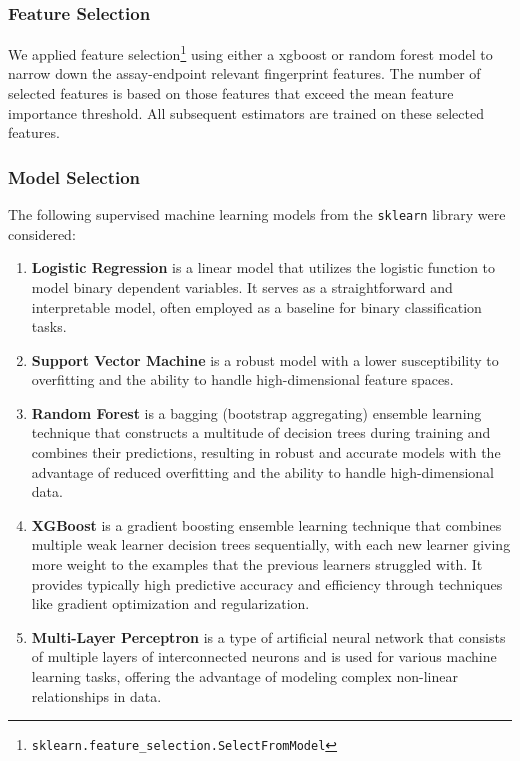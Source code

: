 \subsubsection{Feature Selection}
We applied feature selection\footnote{\texttt{sklearn.feature\_selection.SelectFromModel}} using either a xgboost or random forest model to narrow down the assay-endpoint relevant fingerprint features. The number of selected features is based on those features that exceed the mean feature importance threshold. All subsequent estimators are trained on these selected features.

\subsubsection{Model Selection}
The following supervised machine learning models from the \texttt{sklearn} library were considered: 
\begin{enumerate}
    \item \textbf{Logistic Regression} is a linear model that utilizes the logistic function to model binary dependent variables. It serves as a straightforward and interpretable model, often employed as a baseline for binary classification tasks.
    \item \textbf{Support Vector Machine} is a robust model with a lower susceptibility to overfitting and the ability to handle high-dimensional feature spaces.
    \item \textbf{Random Forest} is a bagging (bootstrap aggregating) ensemble learning technique that constructs a multitude of decision trees during training and combines their predictions, resulting in robust and accurate models with the advantage of reduced overfitting and the ability to handle high-dimensional data.
    \item \textbf{XGBoost} is a gradient boosting ensemble learning technique that combines multiple weak learner decision trees sequentially, with each new learner giving more weight to the examples that the previous learners struggled with. It provides typically high predictive accuracy and efficiency through techniques like gradient optimization and regularization.
    \item \textbf{Multi-Layer Perceptron} is a type of artificial neural network that consists of multiple layers of interconnected neurons and is used for various machine learning tasks, offering the advantage of modeling complex non-linear relationships in data.
\end{enumerate}

